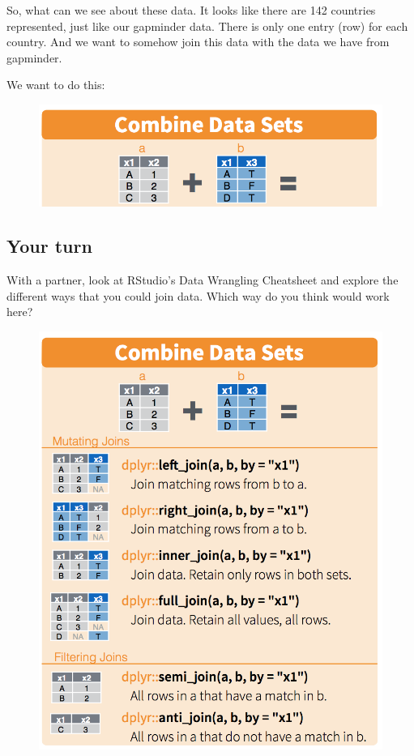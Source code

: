\documentclass[]{book}
\theoremstyle{definition}
\theoremstyle{definition}
\theoremstyle{definition}
\theoremstyle{remark}
\begin{document}
So, what can we see about these data. It looks like there are 142
countries represented, just like our gapminder data. There is only one
entry (row) for each country. And we want to somehow join this data with
the data we have from gapminder.

We want to do this:

\begin{figure}[htbp]
\centering
\includegraphics{img/rstudio-cheatsheet-combine.png}
\caption{}
\end{figure}

\subsection{Your turn}\label{your-turn-13}

With a partner, look at RStudio's Data Wrangling Cheatsheet and explore
the different ways that you could join data. Which way do you think
would work here?

\begin{figure}[htbp]
\centering
\includegraphics{img/rstudio-cheatsheet-combine-options.png}
\caption{}
\end{figure}
\end{document}
